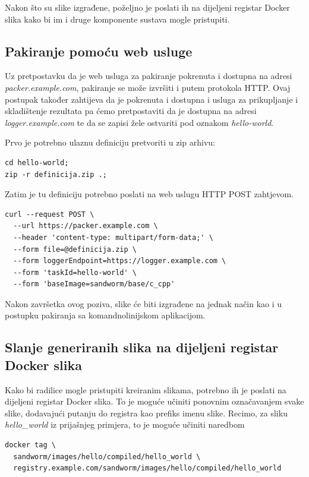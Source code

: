 \documentclass[times, utf8, zavrsni]{fer}
\begin{document}
{{{\begin{appendices}
Nakon što su slike izgrađene, poželjno je poslati ih na dijeljeni registar Docker slika kako bi im i druge komponente sustava mogle pristupiti.

\subsection{Pakiranje pomoću web usluge}

Uz pretpostavku da je web usluga za pakiranje pokrenuta i dostupna na adresi {\textit{packer.example.com}}, pakiranje se može izvršiti i putem protokola HTTP. Ovaj postupak također zahtijeva da je pokrenuta i dostupna i usluga za prikupljanje i skladištenje rezultata pa ćemo pretpostaviti da je dostupna na adresi {\textit{logger.example.com}} te da se zapisi žele ostvariti pod oznakom {\textit{hello-world}}.

Prvo je potrebno ulaznu definiciju pretvoriti u zip arhivu:

\begin{lstlisting}
cd hello-world;
zip -r definicija.zip .;
\end{lstlisting}

Zatim je tu definiciju potrebno poslati na web uslugu HTTP POST zahtjevom.

\begin{lstlisting}
curl --request POST \
  --url https://packer.example.com \
  --header 'content-type: multipart/form-data;' \
  --form file=@definicija.zip \
  --form loggerEndpoint=https://logger.example.com \
  --form 'taskId=hello-world' \
  --form 'baseImage=sandworm/base/c_cpp'
\end{lstlisting}

Nakon završetka ovog poziva, slike će biti izgrađene na jednak način kao i u postupku pakiranja sa komandnolinijskom aplikacijom.

\subsection{Slanje generiranih slika na dijeljeni registar Docker slika}

Kako bi radilice mogle pristupiti kreiranim slikama, potrebno ih je poslati na dijeljeni registar Docker slika. To je moguće učiniti ponovnim označavanjem svake slike, dodavajući putanju do registra kao prefiks imenu slike. Recimo, za sliku {\textit{hello\_world}} iz prijašnjeg primjera, to je moguće učiniti naredbom

\begin{lstlisting}
docker tag \
  sandworm/images/hello/compiled/hello_world \
  registry.example.com/sandworm/images/hello/compiled/hello_world
\end{lstlisting}


\end{appendices}}}}
\end{document}
